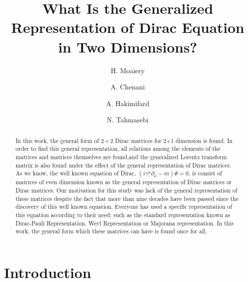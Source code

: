 \documentclass[twocolumn,aps,prb,showpacs]{revtex4-1}
\begin{document}
\title[Example of an Article with a Long Title]
{What Is the Generalized Representation of Dirac Equation in Two Dimensions?}
\author{H. Moaiery}
\author{A. Chenani}
\author{A. Hakimifard}
\author{N. Tahmasebi}


\begin{abstract}
	In this work, the general form of $2\times2$ Dirac matrices for 2+1 dimension is found. In order to find this general representation, all relations among the elements of the matrices and matrices themselves are found,and the generalized Lorentz transform matrix is also found under the effect of the general representation of Dirac matrices. As we know, the well known equation of Dirac, $ \left( i\gamma^{\mu}\partial_{\mu}-m\right) \Psi=0 $,
	is consist of matrices of even dimension known as the general representation of Dirac matrices or Dirac matrices. Our motivation for this study was lack of the general representation of these matrices despite the fact that more than nine decades have been passed since the discovery of this well known equation. Everyone has used a specific representation of this equation according to their need; such as the standard representation known as Dirac-Pauli Representation, Weyl Representation or Majorana representation. In this work, the general form which these matrices can have is found once for all.
\end{abstract}


\maketitle





\section{Introduction}
\end{document}
